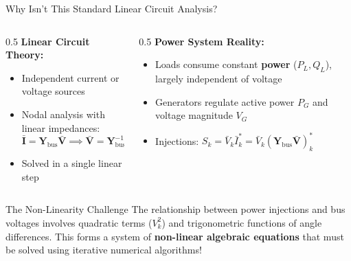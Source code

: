 \begin{frame}[allowframebreaks]{Why Isn't This Standard Linear Circuit Analysis?}
    \begin{columns}
        \begin{column}{0.5\textwidth}
            \textbf{Linear Circuit Theory:}
            \begin{itemize}
                \item Independent current or voltage sources
                \item Nodal analysis with linear impedances:
                $$\mathbf{\bar{I}} = \mathbf{Y}_{\text{bus}} \mathbf{\bar{V}} \implies \mathbf{\bar{V}} = \mathbf{Y}_{\text{bus}}^{-1} \mathbf{\bar{I}}$$
                \item Solved in a single linear step
            \end{itemize}
        \end{column}
        \begin{column}{0.5\textwidth}
            \textbf{Power System Reality:}
            \begin{itemize}
                \item Loads consume constant \textbf{power} ($P_L, Q_L$), largely independent of voltage
                \item Generators regulate active power $P_G$ and voltage magnitude $V_G$
                \item Injections: $S_k = \bar{V}_k \bar{I}_k^* = \bar{V}_k (\mathbf{Y}_{\text{bus}}\mathbf{\bar{V}})_k^*$
            \end{itemize}
        \end{column}
    \end{columns}

    \begin{block}{The Non-Linearity Challenge}
        The relationship between power injections and bus voltages involves quadratic terms ($V_k^2$) and trigonometric functions of angle differences.
        This forms a system of \textbf{non-linear algebraic equations} that must be solved using iterative numerical algorithms!
    \end{block}
\end{frame}

